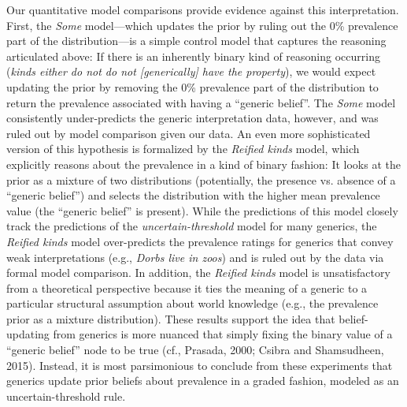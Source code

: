 \documentclass[floatsintext,man]{apa6}
\begin{document}
Our quantitative model comparisons provide evidence against this interpretation.
First, the \emph{Some} model---which updates the prior by ruling out the 0\% prevalence part of the distribution---is a simple control model that captures the reasoning articulated above: If there is an inherently binary kind of reasoning occurring (\emph{kinds either do not do not [generically] have the property}), we would expect updating the prior by removing the 0\% prevalence part of the distribution to return the prevalence associated with having a ``generic belief''. 
The \emph{Some} model consistently under-predicts the generic interpretation data, however, and was ruled out by model comparison given our data.
An even more sophisticated version of this hypothesis is formalized by the \emph{Reified kinds} model, which explicitly reasons about the prevalence in a kind of binary fashion: It looks at the prior as a mixture of two distributions (potentially, the presence vs. absence of a ``generic belief'') and selects the distribution with the higher mean prevalence value (the ``generic belief'' is present).
While the predictions of this model closely track the predictions of the \emph{uncertain-threshold} model for many generics, the \emph{Reified kinds} model over-predicts the prevalence ratings for generics that convey weak interpretations (e.g., \emph{Dorbs live in zoos}) and is ruled out by the data via formal model comparison. 
In addition, the \emph{Reified kinds} model is unsatisfactory from a theoretical perspective because it ties the meaning of a generic to a particular structural assumption about world knowledge (e.g., the prevalence prior as a mixture distribution). 
These results support the idea that belief-updating from generics is more nuanced that simply fixing the binary value of a ``generic belief'' node to be true (cf., Prasada, 2000; Csibra and Shamsudheen, 2015).
Instead, it is most parsimonious to conclude from these experiments that generics update prior beliefs about prevalence in a graded fashion, modeled as an uncertain-threshold rule.
\end{document}
